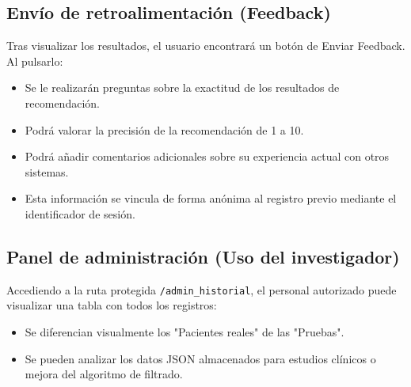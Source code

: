 \subsection{Envío de retroalimentación (Feedback)}
Tras visualizar los resultados, el usuario encontrará un botón de Enviar Feedback. Al pulsarlo:
\begin{itemize}
	\item Se le realizarán preguntas sobre la exactitud de los resultados de recomendación.
	\item Podrá valorar la precisión de la recomendación de 1 a 10.
	\item Podrá añadir comentarios adicionales sobre su experiencia actual con otros sistemas.
	\item Esta información se vincula de forma anónima al registro previo mediante el identificador de sesión.
\end{itemize}

\subsection{Panel de administración (Uso del investigador)}
Accediendo a la ruta protegida \texttt{/admin\_historial}, el personal autorizado puede visualizar una tabla con todos los registros:
\begin{itemize}
	\item Se diferencian visualmente los "Pacientes reales" de las "Pruebas".
	\item Se pueden analizar los datos JSON almacenados para estudios clínicos o mejora del algoritmo de filtrado.
\end{itemize}
    
     